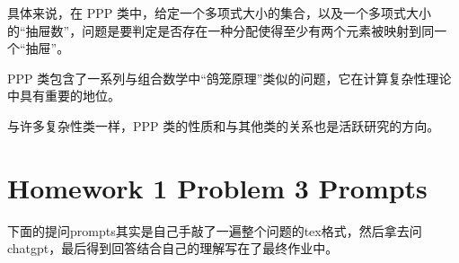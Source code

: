 \documentclass{article}
\begin{document}
具体来说，在 PPP 类中，给定一个多项式大小的集合，以及一个多项式大小的“抽屉数”，问题是要判定是否存在一种分配使得至少有两个元素被映射到同一个“抽屉”。

PPP 类包含了一系列与组合数学中“鸽笼原理”类似的问题，它在计算复杂性理论中具有重要的地位。

与许多复杂性类一样，PPP 类的性质和与其他类的关系也是活跃研究的方向。


\section{Homework 1 Problem 3 Prompts}

下面的提问prompts其实是自己手敲了一遍整个问题的tex格式，然后拿去问chatgpt，最后得到回答结合自己的理解写在了最终作业中。
\end{document}
